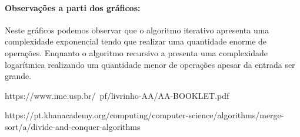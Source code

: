 \documentclass[12pt]{article}
\begin{document}
	
	\paragraph{Observações a parti dos gráficos: } 
	Neste gráficos podemos observar que o algoritmo iterativo apresenta uma complexidade exponencial tendo que realizar uma quantidade enorme de operações. Enquanto o algoritmo recursivo a presenta uma complexidade logarítmica realizando um quantidade menor de operações apesar da entrada ser grande.
	
	
	
	
	
	
	https://www.ime.usp.br/~pf/livrinho-AA/AA-BOOKLET.pdf
	
	https://pt.khanacademy.org/computing/computer-science/algorithms/merge-sort/a/divide-and-conquer-algorithms
	
	
\end{document}
